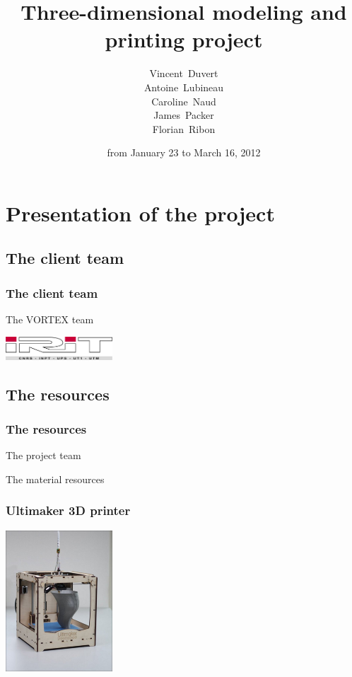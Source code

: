 \documentclass{beamer}
\title{Three-dimensional modeling and printing project}
\subtitle{}
\author[V. D., A. L., C. N., J. P., F. R.]{\begin{scriptsize}
Vincent~Duvert \\ Antoine~Lubineau \\ Caroline~Naud \\ James~Packer \\ Florian~Ribon\end{scriptsize}}
\date{from January 23 to March 16, 2012}
\begin{document}
\frame{\titlepage}

\section{Presentation of the project}

\subsection{The client team}
\begin{frame}
	\frametitle{The client team}
	
	\begin{block}{The \textsc{VORTEX} team}
    \end{block}
    
    \begin{center}
		\includegraphics[width=4cm]{irit}	
	\end{center}
    
\end{frame}

\subsection{The resources}
\begin{frame}
	\frametitle{The resources}
	
	\begin{block}{The project team}
    \end{block}
    
    \begin{block}{The material resources}
    \end{block}
      
\end{frame}

\begin{frame}
	\frametitle{Ultimaker 3D printer}

    \begin{center}
		\includegraphics[width=4cm]{Ultimaker}	
	\end{center}
    
\end{frame}
\end{document}
